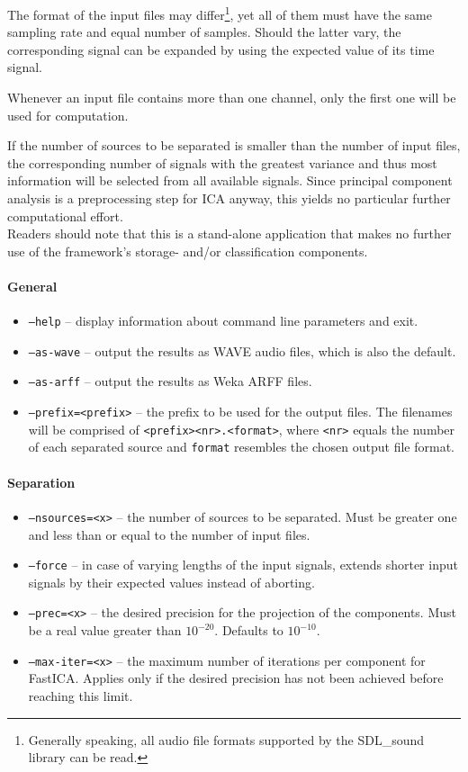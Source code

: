 The format of the input files may differ\footnote{Generally speaking, all audio
  file formats supported by the SDL\_sound library can be read.}, yet all of them
must have the same sampling rate and equal number of samples. Should the latter
vary, the corresponding signal can be expanded by using the expected value of
its time signal.

Whenever an input file contains more than one channel, only the first one will
be used for computation.

If the number of sources to be separated is smaller than the number of input
files, the corresponding number of signals with the greatest variance and thus
most information will be selected from all available signals. Since principal
component analysis is a preprocessing step for ICA anyway, this yields no
particular further computational effort.\\

Readers should note that this is a stand-alone application that makes no further
use of the framework's storage- and/or classification components.


\paragraph{General}

\begin{itemize}
  \item {\tt --help} -- display information about command line parameters and
    exit.
  \item {\tt --as-wave} -- output the results as WAVE audio files, which is
    also the default.
  \item {\tt --as-arff} -- output the results as Weka ARFF files.
  \item {\tt --prefix=<prefix>} -- the prefix to be used for the output
    files. The filenames will be comprised of \verb!<prefix><nr>.<format>!,
    where \verb!<nr>! equals the number of each separated source and
    \verb!format!  resembles the chosen output file format.
\end{itemize}

\paragraph{Separation}

\begin{itemize}
  \item {\tt --nsources=<x>} -- the number of sources to be separated. Must be
    greater one and less than or equal to the number of input files.
  \item {\tt --force} -- in case of varying lengths of the input signals,
    extends shorter input signals by their expected values instead of aborting.
  \item {\tt --prec=<x>} -- the desired precision for the projection of the
    components. Must be a real value greater than $10^{-20}$. Defaults to
    $10^{-10}$.
  \item {\tt --max-iter=<x>} -- the maximum number of iterations per component
    for FastICA. Applies only if the desired precision has not been achieved
    before reaching this limit.
\end{itemize}


